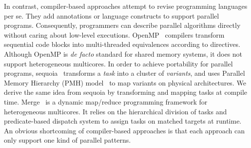 



In contrast, compiler-based approaches attempt to revise
programming languages per se. They add annotations or language constructs to
support parallel programs. Consequently, programmers
can describe parallel algorithms directly without caring about low-level executions.
OpenMP~\cite{openmp} compilers transform sequential code blocks into
multi-threaded equivalences according to directives. Although OpenMP
is \textit{de facto} standard for shared memory systems, it does not
support heterogeneous multicores. In order to achieve portability for
parallel programs, sequoia~\cite{sequoia, sequoia-compiler} transforms a \textit{task} into a cluster of
\emph{variants}, and uses Parallel Memory Hierarchy (PMH)
model~\cite{pmh} to map variants on physical architectures.
We derive the same idea from sequoia by transforming and mapping tasks
at compile time. Merge~\cite{merge} is a dynamic map/reduce programming
framework for heterogeneous multicores. It relies on the hierarchical division of tasks and predicate-based
dispatch system to assign tasks on matched targets at runtime. An obvious shortcoming of compiler-based approaches is that each
approach can only support one kind of parallel patterns. 

